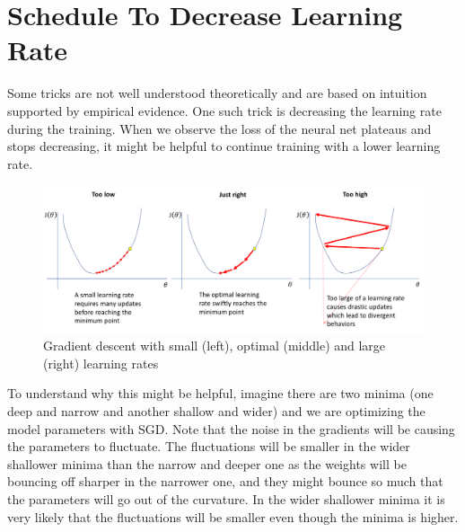 {\centering{}\par}

\section{Schedule To Decrease Learning Rate}
Some tricks are not well understood theoretically and are based on intuition supported by empirical evidence. 
One such trick is decreasing the learning rate during the training. 
When we observe the loss of the neural net plateaus and stops decreasing, it might be helpful to continue training with a lower learning rate. 

\begin{figure}[hbt!]
\centering
\includegraphics[width=120mm]{lectures/02-b/Learning rate_3.png}
\caption{Gradient descent with small (left), optimal (middle) and large (right) learning rates}
\label{fig:learningrate1}
\end{figure}

To understand why this might be helpful, imagine there are two minima (one deep and narrow and another shallow and wider) and we are optimizing the model parameters with SGD.
Note that the noise in the gradients will be causing the parameters to fluctuate. 
The fluctuations will be smaller in the wider shallower minima than the narrow and deeper one as the weights will be bouncing off sharper in the narrower one, and they might bounce so much that the parameters will go out of the curvature. 
In the wider shallower minima it is very likely that the fluctuations will be smaller even though the minima is higher.

